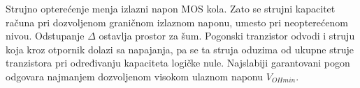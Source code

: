 Strujno opterećenje menja izlazni napon MOS kola. Zato se strujni kapacitet računa pri dozvoljenom graničnom izlaznom naponu, umesto pri neopterećenom nivou. Odstupanje $\Delta$ ostavlja prostor za šum. Pogonski tranzistor odvodi i struju koja kroz otpornik dolazi sa napajanja, pa se ta struja oduzima od ukupne struje tranzistora pri određivanju kapaciteta logičke nule. Najslabiji garantovani pogon odgovara najmanjem dozvoljenom visokom ulaznom naponu $V_{OHmin}$.
